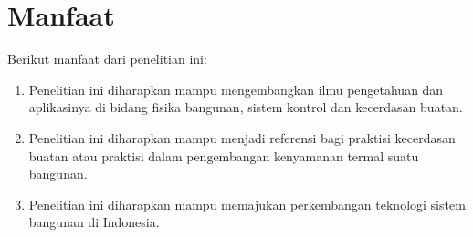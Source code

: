 \section{Manfaat}
Berikut manfaat dari penelitian ini:
\begin{enumerate}
	\item Penelitian ini diharapkan mampu mengembangkan ilmu pengetahuan dan aplikasinya di bidang fisika bangunan, sistem kontrol dan kecerdasan buatan.
	\item Penelitian ini diharapkan mampu menjadi referensi bagi praktisi kecerdasan buatan atau praktisi dalam pengembangan kenyamanan termal suatu bangunan.
	\item Penelitian ini diharapkan mampu memajukan perkembangan teknologi sistem bangunan di Indonesia.
\end{enumerate}


